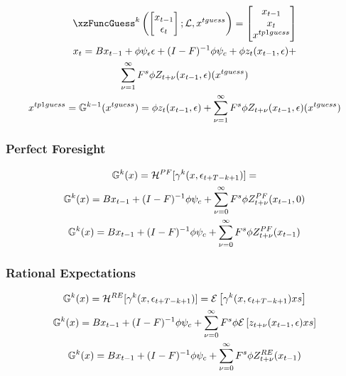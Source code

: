 \documentclass[tikz]{beamer}
\begin{document}
\begin{frame}
  \begin{gather}
  \xzFuncGuess^k \left (
  \begin{bmatrix}
    x_{t-1} \\\epsilon_t
  \end{bmatrix}; \linMod,\xguss
\right )=
  \begin{bmatrix}
    x_{t-1}\\ x_t\\ \xtpguss
  \end{bmatrix}\\
x_t= \sumLinPart + \sumZPartZero +\\  \sumZPartPos(\xguss)\\
\xtpguss=\XZFunc^{k-1}(\xguss) = \sumZPartZero +  \sumZPartPos(\xguss)\label{seriesForm}
  \end{gather}
\end{frame}
\begin{frame}
\frametitle{Perfect Foresight}


\begin{gather}
{\mathbb{G}}^{k}(x)=     \mathcal{H}^{PF}[{{\gamma}}^{k}(x,\epsilon_{t+T-k+1})]=\\
{\mathbb{G}}^{k}(x)={ B x_{t-1}+ (I - F)^{-1} \phi \psi_c } +   { \sum_{{\nu}=0}^\infty F^s \phi Z^{PF}_{t+{\nu}}(x_{t-1},0) }\\
 {\mathbb{G}}^{k}(x)={ B x_{t-1}+ (I - F)^{-1} \phi \psi_c } + { \sum_{{\nu}=0}^\infty F^s \phi {Z^{PF}_{t+{\nu}}(x_{t-1})} }
\end{gather}

\end{frame}
\begin{frame}
  
 \frametitle{Rational Expectations}

 \begin{gather}
 {\mathbb{G}}^{k}(x)=     \mathcal{H}^{RE}[{{\gamma}}^{k}(x,\epsilon_{t+T-k+1})]=
 {\mathcal{E}\left [ {{\gamma}}^{k}(x,\epsilon_{t+T-k+1}) xs\right ]}\\
  {\mathbb{G}}^{k}(x)={ B x_{t-1}+ (I - F)^{-1} \phi \psi_c } + { \sum_{{\nu}=0}^\infty F^s \phi {\mathcal{E}\left [ z_{t+{\nu}}(x_{t-1},\epsilon) xs\right ]} }\\
 {\mathbb{G}}^{k}(x)={ B x_{t-1}+ (I - F)^{-1} \phi \psi_c } + { \sum_{{\nu}=0}^\infty F^s \phi {Z^{RE}_{t+{\nu}}(x_{t-1})} }
 \end{gather}




\end{frame}
\end{document}
